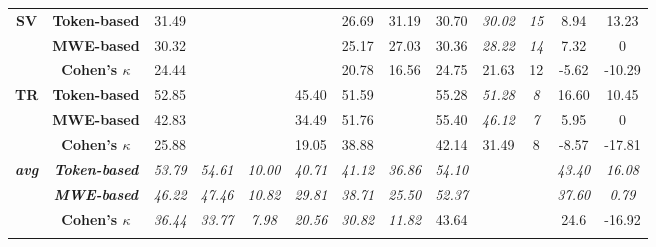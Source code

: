 \documentclass[output=paper
,modfonts
,nonflat,draftmode]{langsci/langscibook}
\begin{document}
\begin{table}
{\begin{tabular}{ccccccccccccc}
\textbf{\scriptsize{}SV} & \textbf{\scriptsize{}Token-based} & {\scriptsize{}31.49} &  &  &  & {\scriptsize{}26.69} & {\scriptsize{}31.19} & {\scriptsize{}30.70} & \emph{\scriptsize{}30.02} & \textit{\scriptsize{}15} & {\scriptsize{}8.94} & {\scriptsize{}13.23}\tabularnewline
 & \textbf{\scriptsize{}MWE-based} & {\scriptsize{}30.32} &  &  &  & {\scriptsize{}25.17} & {\scriptsize{}27.03} & {\scriptsize{}30.36} & \emph{\scriptsize{}28.22} & \textit{\scriptsize{}14} & {\scriptsize{}7.32} & {\scriptsize{}0}\tabularnewline
   & \textbf{\scriptsize{}Cohen's $\kappa$} &\scriptsize{24.44}  &\scriptsize{}  &\scriptsize{}  & \scriptsize{} &\scriptsize{20.78}  &\scriptsize{16.56}  &\scriptsize{24.75} &\scriptsize{21.63}  &\scriptsize{12} & \scriptsize{-5.62} &\scriptsize{-10.29}  \tabularnewline
\midrule 

\textbf{\scriptsize{}TR} & \textbf{\scriptsize{}Token-based} & {\scriptsize{}52.85} &  &  & {\scriptsize{}45.40} & {\scriptsize{}51.59} &  & {\scriptsize{}55.28} & \emph{\scriptsize{}51.28} & \textit{\scriptsize{}8} & {\scriptsize{}16.60} & {\scriptsize{}10.45}\tabularnewline
 & \textbf{\scriptsize{}MWE-based} & {\scriptsize{}42.83} &  &  & {\scriptsize{}34.49} & {\scriptsize{}51.76} &  & {\scriptsize{}55.40} & \emph{\scriptsize{}46.12} & \textit{\scriptsize{}7} & {\scriptsize{}5.95} & {\scriptsize{}0}\tabularnewline
   & \textbf{\scriptsize{}Cohen's $\kappa$} &\scriptsize{25.88}  &\scriptsize{}  &\scriptsize{}  & \scriptsize{19.05} &\scriptsize{38.88}  &\scriptsize{}  &\scriptsize{42.14} &\scriptsize{31.49}  &\scriptsize{8} & \scriptsize{-8.57}&\scriptsize{-17.81}  \tabularnewline
\midrule 

\textbf{\emph{\scriptsize{}avg}} & \textbf{\emph{\scriptsize{}Token-based}} & \emph{\scriptsize{}53.79} & \emph{\scriptsize{}54.61} & \emph{\scriptsize{}10.00} & \emph{\scriptsize{}40.71} & \emph{\scriptsize{}41.12} & \emph{\scriptsize{}36.86} & \emph{\scriptsize{}54.10} &  &  & \textit{\scriptsize{}43.40} & \textit{\scriptsize{}16.08}\tabularnewline
 & \textbf{\emph{\scriptsize{}MWE-based}} & \emph{\scriptsize{}46.22} & \emph{\scriptsize{}47.46} & \emph{\scriptsize{}10.82} & \emph{\scriptsize{}29.81} & \emph{\scriptsize{}38.71} & \emph{\scriptsize{}25.50} & \emph{\scriptsize{}52.37} &  &  & \textit{\scriptsize{}37.60} & \textit{\scriptsize{}0.79}\tabularnewline
   & \textbf{\scriptsize{}Cohen's $\kappa$} & \emph{\scriptsize{36.44} } & \emph{\scriptsize{33.77} } & \emph{\scriptsize{7.98}}  & \emph{ \scriptsize{20.56}} & \emph{\scriptsize{30.82} } & \emph{\scriptsize{11.82}}  &\scriptsize{43.64} &\scriptsize{}  &\scriptsize{} & \scriptsize{24.6} &\scriptsize{-16.92} \tabularnewline
\lspbottomrule

\end{tabular}{\scriptsize \par}

}

\end{table}
\end{document}
